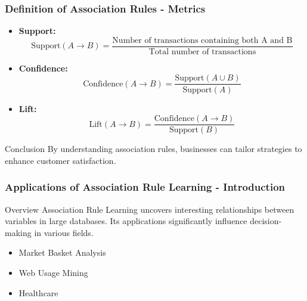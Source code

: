 \documentclass{beamer}
\begin{document}
\begin{frame}[fragile]
    \frametitle{Definition of Association Rules - Metrics}
    \begin{itemize}
        \item \textbf{Support:} 
            \begin{equation}
                \text{Support}(A \rightarrow B) = \frac{\text{Number of transactions containing both A and B}}{\text{Total number of transactions}}
            \end{equation}
        
        \item \textbf{Confidence:}
            \begin{equation}
                \text{Confidence}(A \rightarrow B) = \frac{\text{Support}(A \cup B)}{\text{Support}(A)}
            \end{equation}

        \item \textbf{Lift:}
            \begin{equation}
                \text{Lift}(A \rightarrow B) = \frac{\text{Confidence}(A \rightarrow B)}{\text{Support}(B)}
            \end{equation}
    \end{itemize}
    \begin{block}{Conclusion}
        By understanding association rules, businesses can tailor strategies to enhance customer satisfaction.
    \end{block}
\end{frame}

\begin{frame}[fragile]
    \frametitle{Applications of Association Rule Learning - Introduction}
    \begin{block}{Overview}
        Association Rule Learning uncovers interesting relationships between variables in large databases. Its applications significantly influence decision-making in various fields. 
    \end{block}
    \begin{itemize}
        \item Market Basket Analysis
        \item Web Usage Mining
        \item Healthcare
    \end{itemize}
\end{frame}
\end{document}
